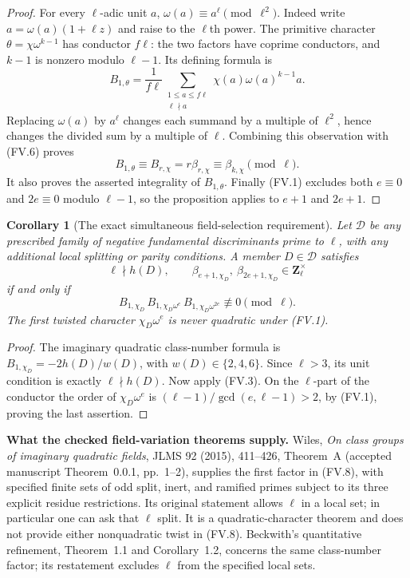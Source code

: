 \documentclass[11pt,a4paper]{article}
\newtheorem{corollary}[theorem]{Corollary}
\theoremstyle{definition}
\renewcommand{\paragraph}[1]{\par\smallskip\noindent\textbf{#1}\quad\ignorespaces}
\begin{document}
\begin{proof}
For every $\ell$-adic unit $a$,
$\omega(a)\equiv a^\ell\pmod{\ell^2}$.  Indeed write
$a=\omega(a)(1+\ell z)$ and raise to the $\ell$th power.
The primitive character $\theta=\chi\omega^{k-1}$ has conductor
$f\ell$: the two factors have coprime conductors, and $k-1$ is
nonzero modulo $\ell-1$.  Its defining formula is
\[
 B_{1,\theta}=\frac1{f\ell}
       \sum_{\substack{1\leq a\leq f\ell\\\ell\nmid a}}
               \chi(a)\omega(a)^{k-1}a.
\]
Replacing $\omega(a)$ by $a^\ell$ changes each summand by a
multiple of $\ell^2$, hence changes the divided sum by a multiple
of $\ell$.  Combining this observation with (FV.6) proves
\[
 B_{1,\theta}\equiv B_{r,\chi}
       =r\beta_{r,\chi}\equiv\beta_{k,\chi}\pmod\ell.
\]
It also proves the asserted integrality of $B_{1,\theta}$.
Finally (FV.1) excludes both $e\equiv0$ and $2e\equiv0$
modulo $\ell-1$, so the proposition applies to $e+1$ and $2e+1$.
\end{proof}

\begin{corollary}[The exact simultaneous field-selection requirement]
Let $\mathcal D$ be any prescribed family of negative fundamental
discriminants prime to $\ell$, with any additional local splitting
or parity conditions.  A member $D\in\mathcal D$ satisfies
\[
 \ell\nmid h(D),\qquad
 \beta_{e+1,\chi_D},\ \beta_{2e+1,\chi_D}\in\mathbf Z_\ell^\times
                                                               \tag{FV.7}
\]
if and only if
\[
 B_{1,\chi_D}\,B_{1,\chi_D\omega^e}\,
 B_{1,\chi_D\omega^{2e}}\not\equiv0\pmod\ell.               \tag{FV.8}
\]
The first twisted character $\chi_D\omega^e$ is never quadratic
under (FV.1).
\end{corollary}
\begin{proof}
The imaginary quadratic class-number formula is
$B_{1,\chi_D}=-2h(D)/w(D)$, with $w(D)\in\{2,4,6\}$.
Since $\ell>3$, its unit condition is exactly $\ell\nmid h(D)$.
Now apply (FV.3).  On the $\ell$-part of the conductor the order
of $\chi_D\omega^e$ is
$(\ell-1)/\gcd(e,\ell-1)>2$, by (FV.1), proving the last assertion.
\end{proof}

\paragraph{What the checked field-variation theorems supply.}
Wiles, \emph{On class groups of imaginary quadratic fields}, JLMS
92 (2015), 411--426, Theorem~A (accepted manuscript
Theorem~0.0.1, pp.~1--2), supplies the first factor in (FV.8),
with specified finite sets of odd split, inert, and ramified primes
subject to its three explicit residue restrictions.  Its original
statement allows $\ell$ in a local set; in particular one can ask
that $\ell$ split.  It is a quadratic-character theorem and does
not provide either nonquadratic twist in (FV.8).  Beckwith's
quantitative refinement, Theorem~1.1 and Corollary~1.2, concerns
the same class-number factor; its restatement excludes $\ell$
from the specified local sets.
\end{document}
